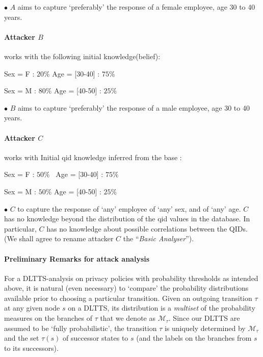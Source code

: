 \documentclass[pdflatex]{article}
\def \M {{\mathcal{M}}}
\def \lft {\noindent}
\begin{document}
  \lft
$\bullet$ $A$ aims to capture `preferably' the response of a female employee,
age 30 to 40 years.

\vspace*{-1.5em}
\paragraph{Attacker $B$} works with the following  initial knowledge(belief): 
\par  \hspace*{6mm} Sex = F : $20\%$      \hspace*{2cm}  Age = [30-40] : $75\%$ 
\par  \hspace*{6mm} Sex = M : $80\%$     \hspace*{2cm}  Age = [40-50] : $25\%$ 

\lft
$\bullet$ $B$ aims to capture `preferably' the response of  a male employee,  age 30
to 40 years.

\vspace*{-1.5em}
\paragraph{Attacker $C$} works with Initial qid knowledge inferred from the base  : 
\par  \hspace*{6mm} Sex = F : $50\%$    \hspace*{2cm} ~Age = [30-40] : $75\%$
\par  \hspace*{6mm} Sex = M : $50\%$   \hspace*{2cm} Age = [40-50] : $25\%$ 

\lft
$\bullet$ $C$ to capture the response of  `any' employee of `any' sex, and of
`any' age. {$C$ has no knowledge beyond the distribution of the qid values in the
  database. In particular, $C$ has no knowledge about possible correlations between
  the QIDs.}\\ \hspace*{1cm}
(We shall  agree to rename attacker $C$ the ``{\em Basic Analyser}''). 

\vspace*{-1mm}
\paragraph{Preliminary Remarks for attack analysis}
For a DLTTS-analysis on privacy policies with probability thresholds  as intended above,
it is natural (even necessary) to `compare' the probability distributions available
prior to choosing a particular transition. Given an outgoing transition $\tau$ at any
given node $s$ on a DLTTS, its distribution is a {\em multiset} of the probability
measures on the branches of $\tau$ that we denote as $\M_{\tau}$. Since our DLTTS
are assumed to be `fully probabilistic', the transition $\tau$ is uniquely determined
by $\M_{\tau}$ and the set $\tau(s)$ of successor states to $s$ (and the labels on the
branches from $s$ to its successors).
\end{document}
